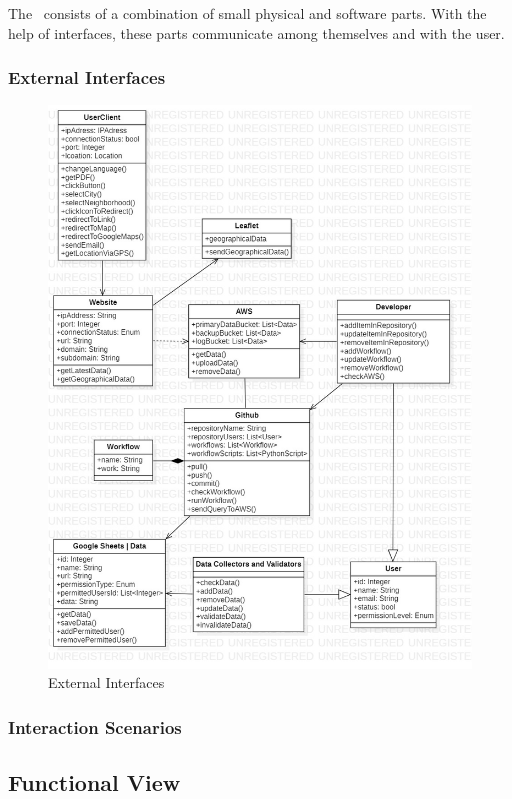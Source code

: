 The \afetbilgi\ consists of a combination of small physical and software parts. With the help of interfaces, these parts communicate among themselves and with the user.

\subsubsection{External Interfaces}

\begin{figure}[H]
  \centering
  \includegraphics[width=\linewidth]{img/external-interfaces-diagram.jpg}
  \caption{External Interfaces}
\end{figure}

\subsubsection{Interaction Scenarios}

\subsection{Functional View}

